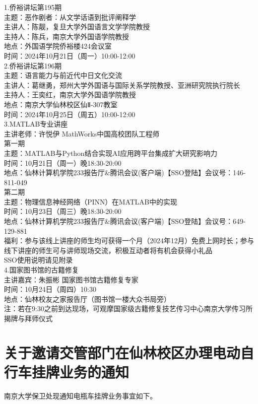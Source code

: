 \documentclass[letterpaper, 12pt]{article}
\begin{document}
\begin{multicols}{2}
1.侨裕讲坛第195期\\
主题：恶作剧者：从文学话语到批评阐释学\\
主讲人：陈靓，复旦大学外国语言文学学院教授\\
主持人：陈兵，南京大学外国语学院教授\\
地点：外国语学院侨裕楼424会议室\\
时间：2024年10月21日（周一）10:00-12:00\\
2.侨裕讲坛第196期\\
主题：语言能力与前近代中日文化交流\\
主讲人：葛继勇，郑州大学外国语与国际关系学院教授、亚洲研究院执行院长\\
主持人：王奕红，南京大学外国语学院教授\\
地点：南京大学仙林校区仙Ⅱ-307教室\\
时间：2024年10月25日（周五）10:00-12:00\\
3.MATLAB专业讲座
\\主讲老师：许悦伊 MathWorks中国高校团队工程师
\\第一期
\\主题：MATLAB与Python结合实现AI应用跨平台集成扩大研究影响力
\\时间：10月21日（周一）晚18:30-20:00
\\地点：仙林计算机学院233报告厅\&腾讯会议(客户端)【SSO登陆】会议号：146-811-049
\\第二期
\\主题：物理信息神经网络（PINN）在MATLAB中的实现
\\时间：10月23日（周三）晚18:30-20:00
\\地点：仙林计算机学院233报告厅\&腾讯会议(客户端)【SSO登陆】会议号：649-129-881
\\福利：参与该线上讲座的师生均可获得一个月（2024年12月）免费上网时长；参与线下讲座的师生可与讲师现场交流，积极互动者将有机会获得小礼品
\\SSO使用说明请见附录
\\4.国家图书馆的古籍修复
\\主讲嘉宾：朱振彬 国家图书馆古籍修复专家
\\时间：10月24日（周四）10:30
\\地点：仙林校友之家报告厅（图书馆一楼大众书局旁）
\\注：若在9:30之前到达现场，可观摩国家级古籍修复技艺传习中心南京大学传习所揭牌与拜师仪式\\

\section{关于邀请交管部门在仙林校区办理电动自行车挂牌业务的通知}
南京大学保卫处现通知电瓶车挂牌业务事宜如下。


\end{multicols}
\end{document}
